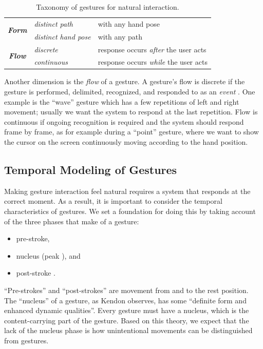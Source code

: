\begin{table}[tbh]
\centering
\begin{tabular}{|c|l|l|}
\hline
\multirow{2}{*}{\textbf{\textit{Form}}} & \textit{distinct path} & with any hand
pose
\\
\cline{2-3} 
                               & \textit{distinct hand pose} & with any path \\
\hline
\multirow{2}{*}{\textbf{\textit{Flow}}} & \textit{discrete} & response occurs
\textit{after} the user acts \\
\cline{2-3}
              & \textit{continuous} & response occurs \textit{while} the user
              acts \\
\hline
\end{tabular}
\caption{Taxonomy of gestures for natural interaction.}
\label{tab:taxonomy}
\end{table}

Another dimension is the \textit{flow} of a gesture. A gesture's flow is
discrete if the gesture is performed, delimited, recognized, and responded to
as an \textit{event} \cite{wobbrock09}. One example is the ``wave'' gesture
which has a few repetitions of left and right movement; usually we want the system to
respond at the last repetition. Flow is continuous if ongoing recognition is required
and the system should respond frame by frame, as for example during a
``point'' gesture, where we want to show the cursor on the screen
continuously moving according to the hand position. 

\subsection{Temporal Modeling of Gestures}
Making gesture interaction feel natural requires a system that responds at the
correct moment. As a result, it is important to consider the temporal
characteristics of gestures. We set a foundation for doing this by taking
account of the three phases that make of a gesture:
\begin{itemize}
  \item pre-stroke,
  \item nucleus (peak \cite{mcneill82}), and
  \item post-stroke \cite{Pavlovic97}.
\end{itemize}

``Pre-strokes'' and ``post-strokes'' are movement from and to the
rest position. The ``nucleus'' of a gesture,
as Kendon \cite{kendon86} observes, has some ``definite form and enhanced dynamic
qualities''. Every gesture must have a nucleus, which is the content-carrying
part of the gesture. Based on this theory, we expect that the lack of the
nucleus phase is how unintentional movements can be distinguished from gestures. 

